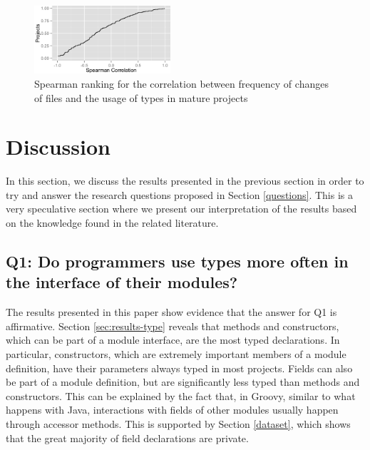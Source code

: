 \documentclass[preprint]{sigplanconf}
\begin{document}
\begin{figure}[h]
\centering \includegraphics[width=0.45\textwidth]{../analysis/result/change_commits_distribution.png} 
\caption{Spearman ranking for the correlation between frequency of changes of files and the usage of types in mature projects}
\label{fig:change_spearman} 
\end{figure}






















%
%
\section{Discussion\label{discussion}}
In this section, we discuss the results presented in the previous section in order to try and answer the research questions proposed in Section \ref{questions}.
This is a very speculative section where we present our interpretation of the results based on the knowledge found in the related literature.

\subsection*{Q1: Do programmers use types more often in the interface of their modules?\label{discussion-q1}}
The results presented in this paper show evidence that the answer for Q1 is affirmative.
Section \ref{sec:results-type} reveals that methods and constructors, which can be part of a module interface, are the most typed declarations.
In particular, constructors, which are extremely important members of a module definition, have their parameters always typed in most projects.
Fields can also be part of a module definition, but are significantly less typed than methods and constructors.
This can be explained by the fact that, in Groovy, similar to what happens with Java, interactions with fields of other modules usually happen through accessor methods.
This is supported by Section \ref{dataset}, which shows that the great majority of field declarations are private.
\end{document}
